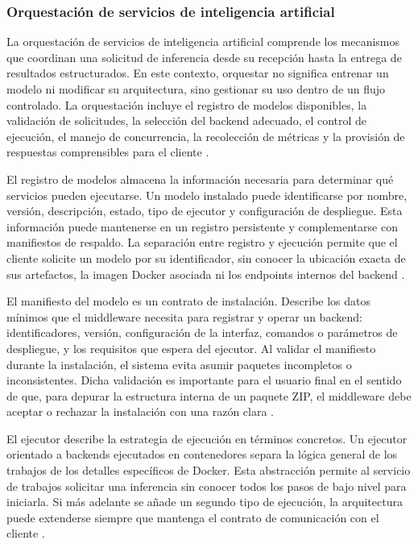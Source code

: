 \subsubsection{Orquestación de servicios de inteligencia artificial}

La orquestación de servicios de inteligencia artificial comprende los mecanismos que coordinan una solicitud de inferencia desde su recepción hasta la entrega de resultados estructurados. En este contexto, orquestar no significa entrenar un modelo ni modificar su arquitectura, sino gestionar su uso dentro de un flujo controlado. La orquestación incluye el registro de modelos disponibles, la validación de solicitudes, la selección del backend adecuado, el control de ejecución, el manejo de concurrencia, la recolección de métricas y la provisión de respuestas comprensibles para el cliente \cite{dragoni2017microservices}.

El registro de modelos almacena la información necesaria para determinar qué servicios pueden ejecutarse. Un modelo instalado puede identificarse por nombre, versión, descripción, estado, tipo de ejecutor y configuración de despliegue. Esta información puede mantenerse en un registro persistente y complementarse con manifiestos de respaldo. La separación entre registro y ejecución permite que el cliente solicite un modelo por su identificador, sin conocer la ubicación exacta de sus artefactos, la imagen Docker asociada ni los endpoints internos del backend \cite{docker2026overview}.

El manifiesto del modelo es un contrato de instalación. Describe los datos mínimos que el middleware necesita para registrar y operar un backend: identificadores, versión, configuración de la interfaz, comandos o parámetros de despliegue, y los requisitos que espera del ejecutor. Al validar el manifiesto durante la instalación, el sistema evita asumir paquetes incompletos o inconsistentes. Dicha validación es importante para el usuario final en el sentido de que, para depurar la estructura interna de un paquete ZIP, el middleware debe aceptar o rechazar la instalación con una razón clara \cite{pydantic2026models}.

El ejecutor describe la estrategia de ejecución en términos concretos. Un ejecutor orientado a backends ejecutados en contenedores separa la lógica general de los trabajos de los detalles específicos de Docker. Esta abstracción permite al servicio de trabajos solicitar una inferencia sin conocer todos los pasos de bajo nivel para iniciarla. Si más adelante se añade un segundo tipo de ejecución, la arquitectura puede extenderse siempre que mantenga el contrato de comunicación con el cliente \cite{docker_sdk_python}.

